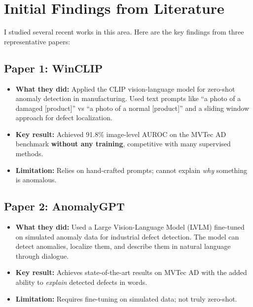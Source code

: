 \documentclass[12pt, a4paper]{article}
\begin{document}
\section{Initial Findings from Literature}

I studied several recent works in this area. Here are the key findings from three representative papers:

\subsection{Paper 1: WinCLIP \cite{jeong2023winclip}}
\begin{itemize}[leftmargin=*]
    \item \textbf{What they did:} Applied the CLIP vision-language model for zero-shot anomaly detection in manufacturing. Used text prompts like ``a photo of a damaged [product]'' vs ``a photo of a normal [product]'' and a sliding window approach for defect localization.
    \item \textbf{Key result:} Achieved 91.8\% image-level AUROC on the MVTec AD benchmark \textbf{without any training}, competitive with many supervised methods.
    \item \textbf{Limitation:} Relies on hand-crafted prompts; cannot explain \textit{why} something is anomalous.
\end{itemize}

\subsection{Paper 2: AnomalyGPT \cite{gu2024anomalygpt}}
\begin{itemize}[leftmargin=*]
    \item \textbf{What they did:} Used a Large Vision-Language Model (LVLM) fine-tuned on simulated anomaly data for industrial defect detection. The model can detect anomalies, localize them, and describe them in natural language through dialogue.
    \item \textbf{Key result:} Achieves state-of-the-art results on MVTec AD with the added ability to \textit{explain} detected defects in words.
    \item \textbf{Limitation:} Requires fine-tuning on simulated data; not truly zero-shot.
\end{itemize}
\end{document}
